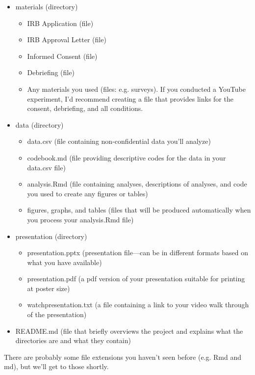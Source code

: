 \documentclass[12pt]{article}
\begin{document}
\begin{itemize}
\item materials (directory)
    \begin{itemize}
    \item IRB Application (file)
    \item IRB Approval Letter (file)
    \item Informed Consent (file)
    \item Debriefing (file)
    \item Any materials you used (files: e.g. surveys). If you conducted a YouTube experiment,
        I'd recommend creating a file that provides links for the consent, debriefing, and all
        conditions.
    \end{itemize}
\item data (directory)
    \begin{itemize}
    \item data.csv (file containing non-confidential data you'll analyze)
    \item codebook.md (file providing descriptive codes for the data in your data.csv file)
    \item analysis.Rmd (file containing analyses, descriptions of analyses, and code you used
        to create any figures or tables)
    \item figures, graphs, and tables (files that will be produced automatically when you process
        your analysis.Rmd file)
    \end{itemize}
\item presentation (directory)
    \begin{itemize}
    \item presentation.pptx (presentation file---can be in
        different formats based on what you have available)
    \item presentation.pdf (a pdf version of your presentation suitable for printing at
        poster size)
    \item watchpresentation.txt (a file containing a link to your video walk through of the
        presentation)
    \end{itemize}
\item README.md (file that briefly overviews the project and explains what the directories are
    and what they contain)
\end{itemize}

There are probably some file extensions you haven't seen before (e.g. Rmd and md), but we'll get
to those shortly.
\end{document}
